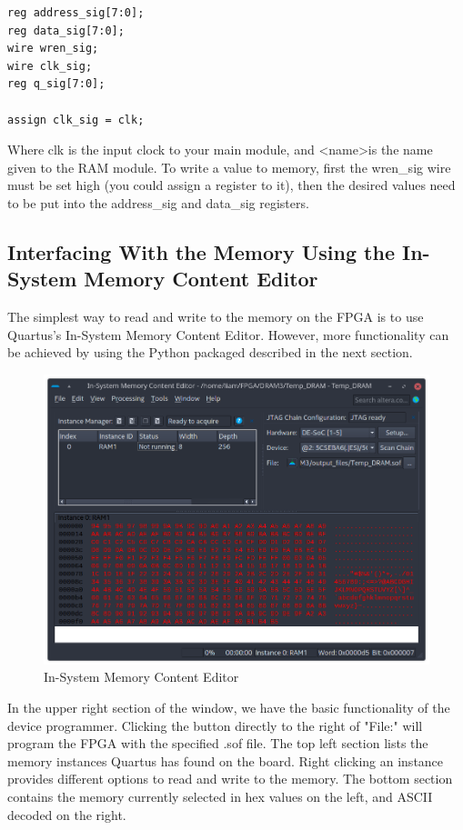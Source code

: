 \documentclass[letter,12pt]{article}
\begin{document}
\begin{verbatim}
reg address_sig[7:0];
reg data_sig[7:0];
wire wren_sig;
wire clk_sig;
reg q_sig[7:0];

assign clk_sig = clk;
\end{verbatim}

Where clk is the input clock to your main module, and \textless name\textgreater is the name given to the RAM module. To write a value to memory, first the wren\_sig wire must be set high (you could assign a register to it), then the desired values need to be put into the address\_sig and data\_sig registers. 


\subsection{Interfacing With the Memory Using the In-System Memory Content Editor}

The simplest way to read and write to the memory on the FPGA is to use Quartus's In-System Memory Content Editor. However, more functionality can be achieved by using the Python packaged described in the next section.

\begin{figure}[H]
  \centering
  \includegraphics[width=\linewidth]{pics/MemoryEditor.png}
  \caption{In-System Memory Content Editor}
\end{figure}

In the upper right section of the window, we have the basic functionality of the device programmer. Clicking the button directly to the right of "File:" will program the FPGA with the specified .sof file. The top left section lists the memory instances Quartus has found on the board. Right clicking an instance provides different options to read and write to the memory. The bottom section contains the memory currently selected in hex values on the left, and ASCII decoded on the right.
\end{document}
